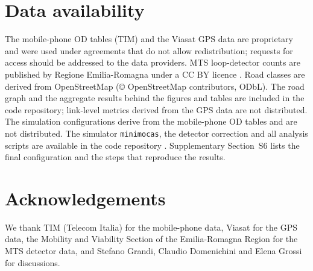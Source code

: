 \documentclass[preprint,11pt,a4paper]{elsarticle}
\begin{document}
\section*{Data availability}
The mobile-phone OD tables (TIM) and the Viasat GPS data are proprietary and were used under agreements that do not allow redistribution; requests for access should be addressed to the data providers. MTS loop-detector counts are published by Regione Emilia-Romagna under a CC BY licence \cite{mtsdata}. Road classes are derived from OpenStreetMap (\copyright{} OpenStreetMap contributors, ODbL). The road graph and the aggregate results behind the figures and tables are included in the code repository; link-level metrics derived from the GPS data are not distributed. The simulation configurations derive from the mobile-phone OD tables and are not distributed. The simulator \texttt{minimocas}, the detector correction and all analysis scripts are available in the code repository \cite{repository}. Supplementary Section~S6 lists the final configuration and the steps that reproduce the results.

\section*{Acknowledgements}
We thank TIM (Telecom Italia) for the mobile-phone data, Viasat for the GPS data, the Mobility and Viability Section of the Emilia-Romagna Region for the MTS detector data, and Stefano Grandi, Claudio Domenichini and Elena Grossi for discussions.



\end{document}
